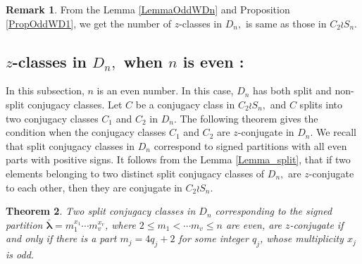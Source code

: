 \documentclass[12pt,twoside,reqno]{amsart}
\newtheorem{theorem}{Theorem}[section]
\theoremstyle{definition}
\newtheorem{remark}[theorem]{Remark}
\numberwithin{equation}{section}
\newcommand{\bmf}[1]{\mathbf{#1}}
\begin{document}
\begin{remark}\label{Remark_odd_D_n}
From the Lemma \ref{LemmaOddWDn} and Proposition \ref{PropOddWD1}, we get the number of $z$-classes in $D_n, $ is same as those in $C_2 \wr S_n.$
\end{remark}


\subsection{$z$-classes in $D_n,$ when $n$ is even :} In this subsection, $n$ is an even number. In this case, $D_n$ has both split and non-split conjugacy classes. 
Let $C$ be a conjugacy class in $C_2 \wr S_n,$ and $C$ splits into two conjugacy classes $C_1$ and $C_2$ in $D_n.$ The following theorem gives the condition when the conjugacy classes $C_1$ and $C_2$ are $z$-conjugate in $D_n.$ We recall that split conjugacy classes in $D_n$ correspond to signed partitions with all even parts with positive signs. It follows from the Lemma \ref{Lemma_split}, that if two elements belonging to two distinct split conjugacy classes of $D_n,$ are $z$-conjugate to each other, then they are conjugate in $C_2\wr S_n.$

\begin{theorem}\label{Th_split_CC_in_D_n}
Two split conjugacy classes in $D_n$ corresponding to the signed partition $\bmf{\bar{\lambda}} = m_1^{x_1}\cdots m_v^{x_v}$, where $2\leq m_1 < \cdots m_v\leq n$ are even, are $z$-conjugate if and only if there is a part $m_j = 4q_j + 2$ for some integer $q_j$, whose multiplicity $x_j$ is odd.
\end{theorem}
\end{document}
